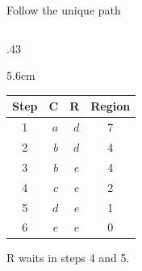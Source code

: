 \begin{frame}{Follow the unique path}
\begin{columns}[T,onlytextwidth]
\begin{column}{.43\textwidth}
\begin{overlayarea}{\linewidth}{5.6cm}
{\begin{tabular}{@{}crrc@{}}
            Step & C & R & Region \\
            \midrule
            1 & $a$ & $d$ & 7 \\
            2 & $b$ & $d$ & 4 \\
            3 & $b$ & $e$ & 4 \\
            4 & $c$ & $e$ & 2 \\
            5 & $d$ & $e$ & 1 \\
            6 & $e$ & $e$ & 0 \\
            \bottomrule
          \end{tabular}
          \smallskip\par
          R waits in steps 4 and 5.
        }
      \end{overlayarea}
    \end{column}
  \end{columns}
\end{frame}

